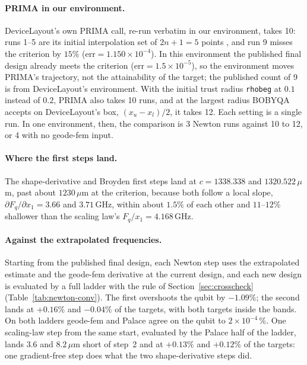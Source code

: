 \documentclass{anvil-paper}
\begin{document}
\paragraph{PRIMA in our environment.}
DeviceLayout's own PRIMA call,
re-run verbatim in our environment, takes 10: runs 1--5 are its initial
interpolation set of $2n+1 = 5$ points \citep{powell2009bobyqa}, and run 9
misses the criterion by $15\%$ ($\mathrm{err} = 1.150\times10^{-4}$). In
this environment the published final design already meets the criterion
($\mathrm{err} = 1.5\times10^{-5}$), so the environment moves PRIMA's
trajectory, not the attainability of the target; the published count of 9
is from DeviceLayout's environment. With the initial trust radius
\texttt{rhobeg} at $0.1$ instead of $0.2$, PRIMA also takes 10 runs, and
at the largest radius BOBYQA accepts on DeviceLayout's box, $(x_u -
x_l)/2$, it takes 12. Each setting is a single run. In one environment, then, the
comparison is 3 Newton runs against 10 to 12, or 4 with no geode-fem input.

\paragraph{Where the first steps land.}
The shape-derivative and Broyden first steps land at $c = 1338.338$ and
$1320.522\,\mu$m, past about $1230\,\mu$m at the criterion, because both
follow a local slope, $\partial F_q/\partial x_1 = 3.66$ and $3.71$\,GHz,
within about $1.5\%$ of each other and $11$--$12\%$ shallower than the
scaling law's $F_q/x_1 = 4.168$\,GHz.

\paragraph{Against the extrapolated frequencies.}
Starting from the published final design, each Newton step uses the
extrapolated estimate and the geode-fem derivative at the current design,
and each new design is evaluated by a full ladder with the rule of
Section~\ref{sec:crosscheck} (Table~\ref{tab:newton-conv}).
The first overshoots the qubit by $-1.09\%$; the second lands at $+0.16\%$
and $-0.04\%$ of the targets, with both targets inside the bands. On both
ladders geode-fem and Palace agree on the qubit to $2\times10^{-4}\,\%$.
One scaling-law step from the same start, evaluated by the Palace half of
the ladder, lands $3.6$ and $8.2\,\mu$m short of step~2 and at $+0.13\%$
and $+0.12\%$ of the targets: one gradient-free step does what the two
shape-derivative steps did.
\end{document}
